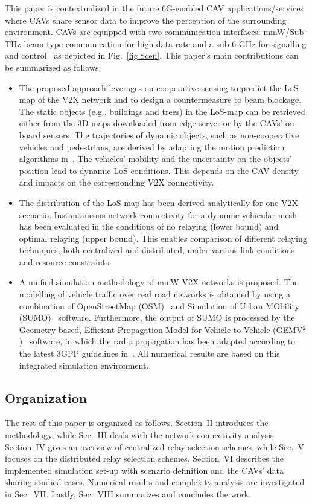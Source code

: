 \documentclass[journal]{IEEEtran}
\begin{document}
This paper is contextualized in the future 6G-enabled CAV applications/services where CAVs share sensor data to improve the perception of the surrounding environment. CAVs are equipped with two communication interfaces: mmW/Sub-THz beam-type communication for high data rate and a sub-6 GHz for signalling and control~\cite{gozalvez} as depicted in Fig.~\ref{fig:Scen}. This paper's main contributions can be summarized as follows:
\begin{itemize} [wide]
\item The proposed approach leverages on cooperative sensing to predict the LoS-map of the V2X network and to design a countermeasure to beam blockage. The static objects (e.g., buildings and trees) in the LoS-map can be retrieved either from the 3D maps downloaded from edge server or by the CAVs' on-board sensors. The trajectories of dynamic objects, such as non-cooperative vehicles and pedestrians, are derived by adapting the motion prediction algorithms in~\cite{soatti1, track, xie2017vehicle}. The vehicles' mobility and the uncertainty on the objects' position lead to dynamic LoS conditions. This depends on the CAV density and impacts on the corresponding V2X connectivity.
\item The distribution of the LoS-map has been derived analytically for one V2X scenario. Instantaneous network connectivity for a dynamic vehicular mesh has been evaluated in the conditions of no relaying (lower bound) and optimal relaying (upper bound). This enables comparison of different relaying techniques, both centralized and distributed, under various link conditions and resource constraints.
\item A unified simulation methodology of mmW V2X networks is proposed. The modelling of vehicle traffic over real road networks is obtained by using a combination of OpenStreetMap (OSM)~\cite{osm} and Simulation of Urban MObility (SUMO)~\cite{SUMO2018} software. Furthermore, the output of SUMO is processed by the Geometry-based, Efficient Propagation Model for Vehicle-to-Vehicle (GEMV$^{2}$)~\cite{GEMV2} software, in which the radio propagation has been adapted according to the latest 3GPP guidelines in~\cite{14rel}. All numerical results are based on this integrated simulation environment.
\end{itemize} 

\subsection*{Organization}
The rest of this paper is organized as follows. Section~II introduces the methodology, while Sec.~III deals with the network connectivity analysis. Section~IV gives an overview of centralized relay selection schemes, while Sec.~V focuses on the distributed relay selection schemes.
Section~VI describes the implemented simulation set-up with scenario definition and the CAVs' data sharing studied cases. Numerical results and complexity analysis are investigated in Sec.~VII. Lastly, Sec.~VIII summarizes and concludes the work.
\end{document}
